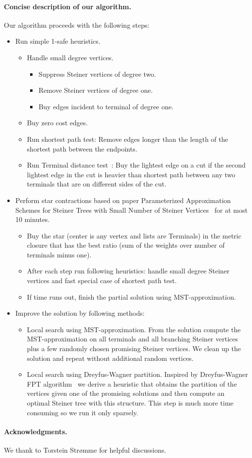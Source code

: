 \documentclass[review,a4paper]{article}
\begin{document}
\paragraph{Concise description of our algorithm.}
Our algorithm proceeds with the following steps:

\begin{itemize}
  \item Run simple 1-safe heuristics.
  \begin{itemize}
  \item Handle small degree vertices.
    \begin{itemize}
      \item Suppress Steiner vertices of degree two.
      \item Remove Steiner vertices of degree one.
      \item Buy edges incident to terminal of degree one.
    \end{itemize}
  \item Buy zero cost edges.
  \item Run shortest path test: Remove edges longer than the length of the shortest path between the endpoints.
  \item Run Terminal distance test~\cite{TDT}: Buy the lightest edge on a cut if the second lightest edge in the cut is heavier than shortest path between any two terminals that are on different sides of the cut.
  \end{itemize}
\item Perform star contractions based on paper Parameterized Approximation Schemes for Steiner Trees with Small Number of Steiner Vertices~\cite{stars} for at most 10 minutes.
  \begin{itemize}
    \item  Buy the star (center is any vertex and lists are Terminals) in the metric closure that has the best ratio (sum of the weights over number of terminals minus one).
    \item After each step run following heuristics: handle small degree Steiner vertices and fast special case of shortest path test.
    \item If time runs out, finish the partial solution using MST-approximation.
  \end{itemize}
\item Improve the solution by following methods:
  \begin{itemize}
    \item Local search using MST-approximation. From the solution compute the MST-approximation on all terminals and all branching Steiner vertices plus a few randomly chosen promising Steiner vertices. We clean up the solution and repeat without additional random vertices.
    \item Local search using Dreyfus-Wagner partition. Inspired by Dreyfus-Wagner FPT algorithm~\cite{DW} we derive a heuristic that obtains the partition of the vertices given one of the promising solutions and then compute an optimal Steiner tree with this structure. This step is much more time consuming so we run it only sparsely.
    \end{itemize}
\end{itemize}

\paragraph{Acknowledgments.}
We thank to Torstein Strømme for helpful discussions.




\end{document}
